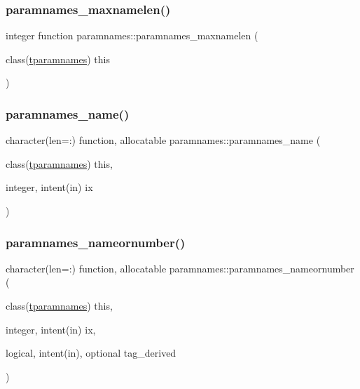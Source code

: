 \mbox{\label{namespaceparamnames_a656b7952494a591736f80bb066f04db2}} 
\subsubsection{\texorpdfstring{paramnames\+\_\+maxnamelen()}{paramnames\_maxnamelen()}}
{\footnotesize\ttfamily integer function paramnames\+::paramnames\+\_\+maxnamelen (\begin{DoxyParamCaption}\item[{class(\mbox{\hyperlink{structparamnames_1_1tparamnames}{tparamnames}})}]{this }\end{DoxyParamCaption})\hspace{0.3cm}{\ttfamily [private]}}

\mbox{\label{namespaceparamnames_a05a1562d6920ecef38e54e88dc6aa7a3}} 
\subsubsection{\texorpdfstring{paramnames\+\_\+name()}{paramnames\_name()}}
{\footnotesize\ttfamily character(len=\+:) function, allocatable paramnames\+::paramnames\+\_\+name (\begin{DoxyParamCaption}\item[{class(\mbox{\hyperlink{structparamnames_1_1tparamnames}{tparamnames}})}]{this,  }\item[{integer, intent(in)}]{ix }\end{DoxyParamCaption})\hspace{0.3cm}{\ttfamily [private]}}

\mbox{\label{namespaceparamnames_aeeea5572332bd77485fd7e18d1461e56}} 
\subsubsection{\texorpdfstring{paramnames\+\_\+nameornumber()}{paramnames\_nameornumber()}}
{\footnotesize\ttfamily character(len=\+:) function, allocatable paramnames\+::paramnames\+\_\+nameornumber (\begin{DoxyParamCaption}\item[{class(\mbox{\hyperlink{structparamnames_1_1tparamnames}{tparamnames}})}]{this,  }\item[{integer, intent(in)}]{ix,  }\item[{logical, intent(in), optional}]{tag\+\_\+derived }\end{DoxyParamCaption})\hspace{0.3cm}{\ttfamily [private]}}



